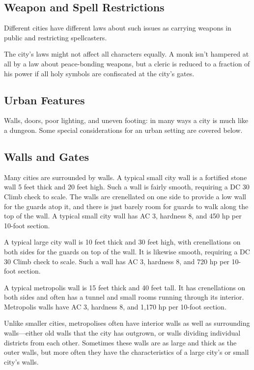\subsection{Weapon and Spell Restrictions}

				
Different cities have different laws about such issues as carrying weapons in public and restricting spellcasters.
				
The city's laws might not affect all characters equally. A monk isn't hampered at all by a law about peace-bonding weapons, but a cleric is reduced to a fraction of his power if all holy symbols are confiscated at the city's gates.
				
\subsection{Urban Features}

				
Walls, doors, poor lighting, and uneven footing: in many ways a city is much like a dungeon. Some special considerations for an urban setting are covered below.
				
\subsection{Walls and Gates}

				
Many cities are surrounded by walls. A typical small city wall is a fortified stone wall 5 feet thick and 20 feet high. Such a wall is fairly smooth, requiring a DC 30 Climb check to scale. The walls are crenellated on one side to provide a low wall for the guards atop it, and there is just barely room for guards to walk along the top of the wall. A typical small city wall has AC 3, hardness 8, and 450 hp per 10-foot section.
				
A typical large city wall is 10 feet thick and 30 feet high, with crenellations on both sides for the guards on top of the wall. It is likewise smooth, requiring a DC 30 Climb check to scale. Such a wall has AC 3, hardness 8, and 720 hp per 10-foot section.
				
A typical metropolis wall is 15 feet thick and 40 feet tall. It has crenellations on both sides and often has a tunnel and small rooms running through its interior. Metropolis walls have AC 3, hardness 8, and 1,170 hp per 10-foot section.
				
Unlike smaller cities, metropolises often have interior walls as well as surrounding walls---either old walls that the city has outgrown, or walls dividing individual districts from each other. Sometimes these walls are as large and thick as the outer walls, but more often they have the characteristics of a large city's or small city's walls.
				
